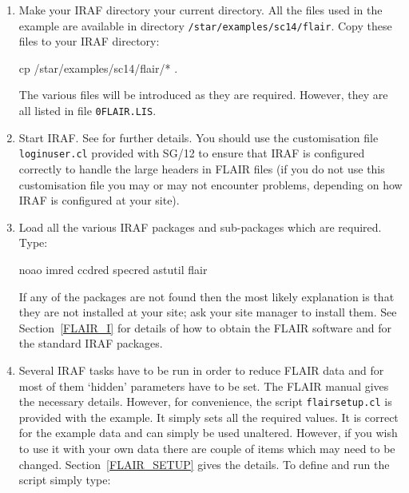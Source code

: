 \documentclass[twoside,11pt]{starlink}
\begin{document}
\begin{enumerate}

  \item Make your IRAF directory your current directory.  All
   the files used in the example are available in directory
   \texttt{/star/examples/sc14/flair}.  Copy these files to your
   IRAF directory:

\begin{terminalv}
cp  /star/examples/sc14/flair/* .
\end{terminalv}

   The various files will be introduced as they are required.
   However, they are all listed in file \texttt{0FLAIR.LIS}.

  \item Start IRAF.  See  for further
   details.  You should use the customisation file \texttt{\newline
   loginuser.cl} provided with SG/12 to ensure that IRAF
   is configured correctly to handle the large headers in
   FLAIR files (if you do not use this customisation file you
   may or may not encounter problems, depending on how IRAF is
   configured at your site).

  \item Load all the various IRAF packages and sub-packages
   which are required.  Type:

\begin{terminalv}
noao
imred
ccdred
specred
astutil
flair
\end{terminalv}

   If any of the packages are not found then the most likely
   explanation is that they are not installed at your site;
   ask your site manager to install them.  See Section~\ref{FLAIR_I}
   for details of how to obtain the FLAIR software and
    for the standard IRAF packages.

  \item Several IRAF tasks have to be run in order to reduce
   FLAIR data and for most of them `hidden' parameters have
   to be set.  The FLAIR manual\cite{DRINK96} gives the
   necessary details.  However, for convenience, the script \texttt{flairsetup.cl} is provided with the example.  It simply sets
   all the required values.  It is correct for the example
   data and can simply be used unaltered.  However, if you wish
   to use it with your own data there are couple of items which
   may need to be changed.  Section~\ref{FLAIR_SETUP} gives the
   details.  To define and run the script simply type:


\end{enumerate}
\end{document}
